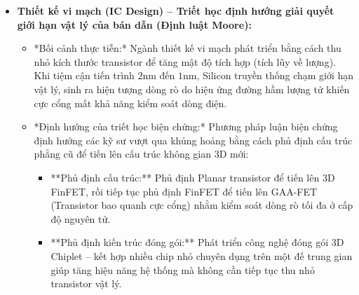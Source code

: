 \documentclass[12pt,a4paper]{article}
\begin{document}
{\begin{itemize}
    \item \textbf{Thiết kế vi mạch (IC Design) -- Triết học định hướng giải quyết giới hạn vật lý của bán dẫn (Định luật Moore):}
    \begin{itemize}
        \item *Bối cảnh thực tiễn:* Ngành thiết kế vi mạch phát triển bằng cách thu nhỏ kích thước transistor để tăng mật độ tích hợp (tích lũy về lượng). Khi tiệm cận tiến trình $2\text{nm}$ đến $1\text{nm}$, Silicon truyền thống chạm giới hạn vật lý, sinh ra hiện tượng dòng rò do hiệu ứng đường hầm lượng tử khiến cực cổng mất khả năng kiểm soát dòng điện.
        \item *Định hướng của triết học biện chứng:* Phương pháp luận biện chứng định hướng các kỹ sư vượt qua khủng hoảng bằng cách phủ định cấu trúc phẳng cũ để tiến lên cấu trúc không gian 3D mới:
        \begin{itemize}
            \item **Phủ định cấu trúc:** Phủ định Planar transistor để tiến lên 3D FinFET, rồi tiếp tục phủ định FinFET để tiến lên GAA-FET (Transistor bao quanh cực cổng) nhằm kiểm soát dòng rò tối đa ở cấp độ nguyên tử.
            \item **Phủ định kiến trúc đóng gói:** Phát triển công nghệ đóng gói 3D Chiplet -- kết hợp nhiều chip nhỏ chuyên dụng trên một đế trung gian giúp tăng hiệu năng hệ thống mà không cần tiếp tục thu nhỏ transistor vật lý.
        \end{itemize}
    \end{itemize}


\end{itemize}}
\end{document}
